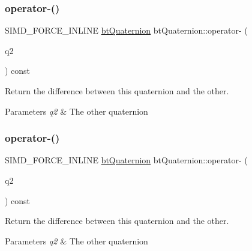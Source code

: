 \subsubsection{\texorpdfstring{operator-\/()}{operator-()}\hspace{0.1cm}{\footnotesize\ttfamily [1/2]}}
{\footnotesize\ttfamily S\+I\+M\+D\+\_\+\+F\+O\+R\+C\+E\+\_\+\+I\+N\+L\+I\+NE \hyperlink{classbtQuaternion}{bt\+Quaternion} bt\+Quaternion\+::operator-\/ (\begin{DoxyParamCaption}\item[{const \hyperlink{classbtQuaternion}{bt\+Quaternion} \&}]{q2 }\end{DoxyParamCaption}) const\hspace{0.3cm}{\ttfamily [inline]}}



Return the difference between this quaternion and the other. 


\begin{DoxyParams}{Parameters}
{\em q2} & The other quaternion \\
\hline
\end{DoxyParams}
\mbox{\label{classbtQuaternion_a2b440e462111b777fd2229446ba4618c}} 
\subsubsection{\texorpdfstring{operator-\/()}{operator-()}\hspace{0.1cm}{\footnotesize\ttfamily [2/2]}}
{\footnotesize\ttfamily S\+I\+M\+D\+\_\+\+F\+O\+R\+C\+E\+\_\+\+I\+N\+L\+I\+NE \hyperlink{classbtQuaternion}{bt\+Quaternion} bt\+Quaternion\+::operator-\/ (\begin{DoxyParamCaption}\item[{const \hyperlink{classbtQuaternion}{bt\+Quaternion} \&}]{q2 }\end{DoxyParamCaption}) const\hspace{0.3cm}{\ttfamily [inline]}}



Return the difference between this quaternion and the other. 


\begin{DoxyParams}{Parameters}
{\em q2} & The other quaternion \\
\hline
\end{DoxyParams}
\mbox{\label{classbtQuaternion_ac942e70c62d09538e3f6d9c42bc42c5c}} 
